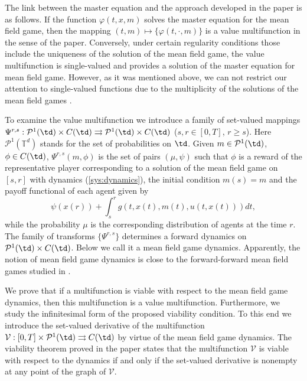 \documentclass[a4paper,12pt]{article}
\newcommand{\ptd}{\mathcal{P}^1(\mathbb{T}^d)}
\begin{document}
The link between the master equation and the approach developed in the paper is as follows. If the function $\varphi(t,x,m)$ solves the master equation for the mean field game, then the  mapping $(t,m)\mapsto \{\varphi(t,\cdot,m)\}$ is a value multifunction in the sense of the paper. Conversely,   under certain regularity conditions those include the uniqueness of the  solution of the mean field game, the value multifunction is single-valued and  provides a solution of the master equation for mean field game. However, as it was mentioned above, we can not restrict our attention to single-valued functions due to  the multiplicity of the solutions of the mean field games \cite{Bardi_Fischer_2017}.

To examine the value multifunction we introduce a family of set-valued mappings  $\Psi^{r,s}:\mathcal{P}^1(\td)\times C(\td)\rightrightarrows \mathcal{P}^1(\td)\times C(\td)$   ($s,r\in [0,T]$, $r\geq s$). Here $\ptd$ stands for the set of probabilities on $\td$. Given  $m\in \mathcal{P}^1(\td)$, $\phi\in C(\td)$, $\Psi^{r,s}(m,\phi)$ is the set of pairs $(\mu,\psi)$ such that $\phi$ is a reward of the representative player corresponding to a solution of the mean field game on $[s,r]$ with  dynamics (\ref{sys:dynamics}), the initial condition $m(s)=m$ and the payoff functional of each agent given by 
$$\psi(x(r))+\int_s^rg(t,x(t),m(t),u(t,x(t)))dt, $$ while the probability $\mu$ is the corresponding distribution of agents at the time $r$. The family of transforms $\{\Psi^{r,s}\}$ determines a forward dynamics on $\mathcal{P}^1(\td)\times C(\td)$. Below we call it a mean field game dynamics. Apparently, the notion of mean field game dynamics is  close to the forward-forward mean field games studied in \cite{Gomes_forward}.  

We prove that if a multifunction is viable with respect to the mean field game dynamics, then this multifunction is a value multifunction. Furthermore, we study the infinitesimal form of the  proposed viability condition. To this end we introduce the set-valued derivative of the multifunction $\mathcal{V}:[0,T]\times\mathcal{P}^1(\td)\rightrightarrows C(\td)$ by virtue of the mean field game dynamics. The viability theorem proved in the paper states that the multifunction $\mathcal{V}$ is viable with respect to the dynamics  if and only if the set-valued derivative is nonempty at any point of the graph of $\mathcal{V}$.
\end{document}
